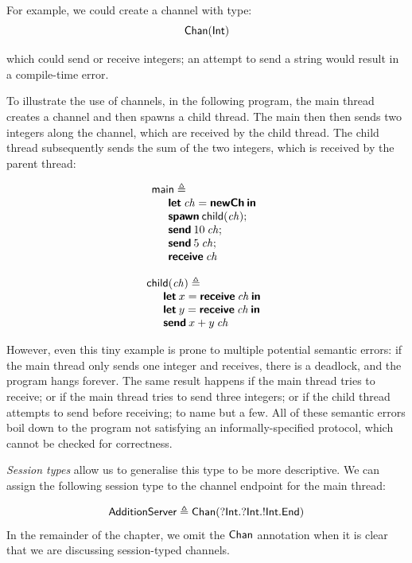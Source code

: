 \documentclass[
graybox,
envcountchap
]{svmult}
\begin{document}
\begin{bibunit}
  For example, we could create a channel with type:
  \[
    \mathsf{Chan}(\mathsf{Int})
  \]


  which could send or receive integers; an attempt to send a string would result
  in a compile-time error.

  To illustrate the use of channels, in the following program, the
  main thread creates a channel and then spawns a child thread. The main
  then then sends two integers along the channel, which are received by the
  child thread. The child thread subsequently sends the sum of the two integers,
  which is received by the parent thread:

  \begin{minipage}{0.45\textwidth}
  \[
    \begin{array}{l}
    \mathsf{main} \triangleq \\
    \quad
      \begin{array}{l}
        \textbf{\textsf{let}} \: \mathit{ch} = \textbf{\textsf{newCh}} \: \textbf{\textsf{in}} \\
        \textbf{\textsf{spawn}} \: \mathsf{child}(\mathit{ch}); \\
        \textbf{\textsf{send}} \: 10 \: \mathit{ch}; \\
        \textbf{\textsf{send}} \: 5 \: \mathit{ch}; \\
        \textbf{\textsf{receive}} \: \mathit{ch}
      \end{array}
    \end{array}
  \]
\end{minipage}
\hfill
\begin{minipage}{0.45\textwidth}
  \[
    \begin{array}{l}
    \mathsf{child}(\mathit{ch}) \triangleq \\
    \quad
      \begin{array}{l}
      \textbf{\textsf{let}} \: x = \textbf{\textsf{receive}} \: \mathit{ch} \: \textbf{\textsf{in}} \\
      \textbf{\textsf{let}} \: y = \textbf{\textsf{receive}} \: \mathit{ch} \: \textbf{\textsf{in}} \\
      \textbf{\textsf{send}} \: x + y \: \mathit{ch}
      \end{array}
    \end{array}
  \]
\end{minipage}


  However, even this tiny example is prone to multiple potential semantic errors: if the
  main thread only sends one integer and receives, there is a deadlock, and the
  program hangs forever. The same result happens if the main thread tries to
  receive; or if the main thread tries to send three integers; or if the child
  thread attempts to send before receiving; to name but a few. All of these
  semantic errors boil down to the program not satisfying an
  informally-specified protocol, which cannot be checked for correctness.

  \emph{Session types} allow us to generalise this type to be more descriptive.
  We can assign the following session type to the channel endpoint for the main
  thread:

  \[
    \mathsf{AdditionServer} \triangleq
    \mathsf{Chan}({?}\mathsf{Int}.{?}\mathsf{Int}.{!}\mathsf{Int}.\mathsf{End})
  \]
  In the remainder of the chapter, we omit the $\mathsf{Chan}$ annotation when it
  is clear that we are discussing session-typed channels.


\end{bibunit}
\end{document}
